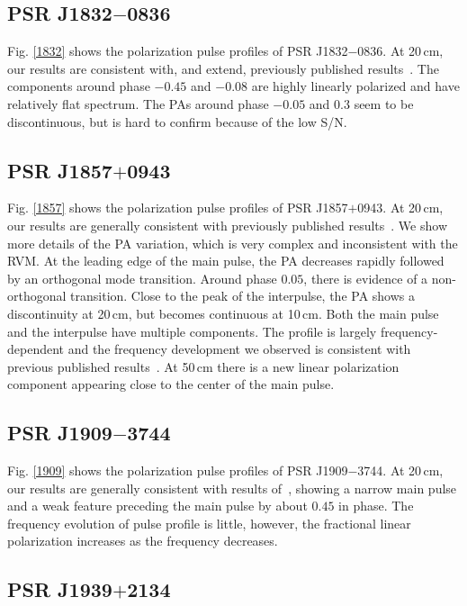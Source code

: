\documentclass[useAMS,usenatbib]{mn2e}
\begin{document}
\begin{appendix}
\subsection{PSR J1832$-$0836}

Fig. \ref{1832} shows the polarization pulse profiles of 
PSR J1832$-$0836.
%
At 20\,cm, our results are consistent with, and extend, previously published 
results~\citep{Burgay13}.
%
The components around phase $-0.45$ and $-0.08$ are highly linearly polarized 
and have relatively flat spectrum. 
%
The PAs around phase $-0.05$ and $0.3$ seem to be discontinuous, but is hard 
to confirm because of the low S/N.


\subsection{PSR J1857$+$0943}

Fig. \ref{1857} shows the polarization pulse profiles of 
PSR J1857$+$0943.
%
At 20\,cm, our results are generally consistent with previously published 
results~\citep{Xilouris98,Yan11}.
%
We show more details of the PA variation, which is very complex and inconsistent
with the RVM.
%
At the leading edge of the main pulse, the PA decreases rapidly followed by an 
orthogonal mode transition. 
%
Around phase $0.05$, there is evidence of a non-orthogonal transition.
%
Close to the peak of the interpulse, the PA shows a discontinuity at 20\,cm, 
but becomes continuous at 10\,cm.
%
Both the main pulse and the interpulse have multiple components. The profile 
is largely frequency-dependent and the frequency development we observed is 
consistent with previous published results~\citep[][]{Thorsett90}. 
At 50\,cm there is a new linear polarization component appearing close to 
the center of the main pulse.


\subsection{PSR J1909$-$3744}

Fig. \ref{1909} shows the polarization pulse profiles of 
PSR J1909$-$3744.
%
At 20\,cm, our results are generally consistent with results of~\citet{Ord04,Yan11}, 
showing a narrow main pulse and a weak feature preceding the main pulse by 
about $0.45$ in phase.
%
The frequency evolution of pulse profile is little, however, the fractional 
linear polarization increases as the frequency decreases.

\subsection{PSR J1939$+$2134}


\end{appendix}
\end{document}
